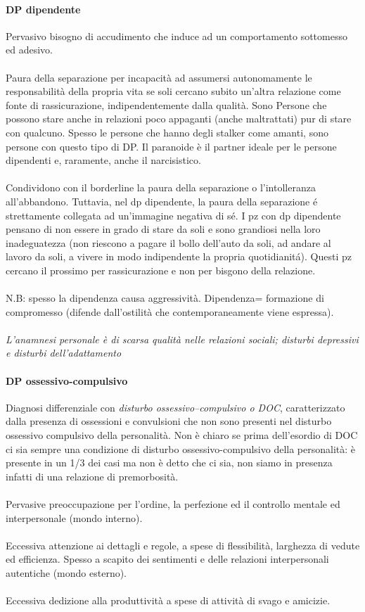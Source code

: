 \paragraph{DP dipendente}

Pervasivo bisogno di accudimento che induce ad un comportamento
sottomesso ed adesivo.
\\\\
Paura della separazione per incapacità ad assumersi autonomamente le
responsabilità della propria vita se soli cercano subito un'altra
relazione come fonte di rassicurazione, indipendentemente dalla qualità.
Sono Persone che possono stare anche in relazioni poco appaganti (anche
maltrattati) pur di stare con qualcuno. Spesso le persone che hanno
degli stalker come amanti, sono persone con questo tipo di DP. Il
paranoide è il partner ideale per le persone dipendenti e, raramente,
anche il narcisistico.
\\\\
Condividono con il borderline la paura della separazione o
l'intolleranza all'abbandono. Tuttavia, nel dp dipendente, la paura
della separazione é strettamente collegata ad un'immagine negativa di
sé. I pz con dp dipendente pensano di non essere in grado di stare da
soli e sono grandiosi nella loro inadeguatezza (non riescono a pagare il
bollo dell'auto da soli, ad andare al lavoro da soli, a vivere in modo
indipendente la propria quotidianitá). Questi pz cercano il prossimo per
rassicurazione e non per bisgono della relazione.
\\\\
N.B: spesso la dipendenza causa aggressività. Dipendenza= formazione di
compromesso (difende dall'ostilità che contemporaneamente viene
espressa).
\\\\
\emph{\emph{L'anamnesi personale è di scarsa qualità nelle relazioni
sociali; disturbi depressivi e disturbi dell'adattamento}}

\paragraph{DP ossessivo-compulsivo}

Diagnosi differenziale con \emph{disturbo ossessivo--compulsivo o DOC},
caratterizzato dalla presenza di ossessioni e convulsioni che non sono
presenti nel disturbo ossessivo compulsivo della personalità. Non è
chiaro se prima dell'esordio di DOC ci sia sempre una condizione di
disturbo ossessivo-compulsivo della personalità: è presente in un 1/3
dei casi ma non è detto che ci sia, non siamo in presenza infatti di una
relazione di premorbosità.
\\\\
Pervasive preoccupazione per l'ordine, la perfezione ed il controllo
mentale ed interpersonale (mondo interno).
\\\\
Eccessiva attenzione ai dettagli e regole, a spese di flessibilità,
larghezza di vedute ed efficienza. Spesso a scapito dei sentimenti e
delle relazioni interpersonali autentiche (mondo esterno).
\\\\
Eccessiva dedizione alla produttività a spese di attività di svago e
amicizie.

